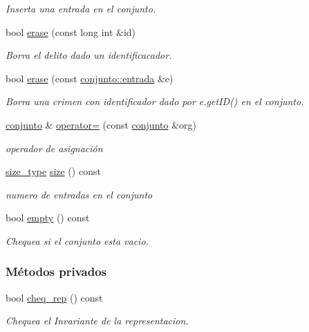\begin{DoxyCompactItemize}
\begin{DoxyCompactList}\small\item\em Inserta una entrada en el conjunto. \end{DoxyCompactList}\item 
bool \hyperlink{classconjunto_ad550177fa4454da3a10fa356417e39a7}{erase} (const long int \&id)
\begin{DoxyCompactList}\small\item\em Borra el delito dado un identificacador. \end{DoxyCompactList}\item 
bool \hyperlink{classconjunto_a77a21ed91f1002f4eaed48d86535a874}{erase} (const \hyperlink{classconjunto_a09cad766dd65de73e51eae21f9d22585}{conjunto\-::entrada} \&e)
\begin{DoxyCompactList}\small\item\em Borra una crimen con identificador dado por e.\-get\-I\-D() en el conjunto. \end{DoxyCompactList}\item 
\hyperlink{classconjunto}{conjunto} \& \hyperlink{classconjunto_a2bdce402a4b76117b68fe71c0dffab87}{operator=} (const \hyperlink{classconjunto}{conjunto} \&org)
\begin{DoxyCompactList}\small\item\em operador de asignación \end{DoxyCompactList}\item 
\hyperlink{classconjunto_a855a5893bb0f5a851ab2dbf2b8aa6cc7}{size\-\_\-type} \hyperlink{classconjunto_a863e1e106e35adda47e7c5e2067295b9}{size} () const 
\begin{DoxyCompactList}\small\item\em numero de entradas en el conjunto \end{DoxyCompactList}\item 
bool \hyperlink{classconjunto_afcf4ff3ff3c1f83b63e901efebe93533}{empty} () const 
\begin{DoxyCompactList}\small\item\em Chequea si el conjunto esta vacio. \end{DoxyCompactList}\end{DoxyCompactItemize}
\subsubsection*{Métodos privados}
\begin{DoxyCompactItemize}
\item 
bool \hyperlink{classconjunto_adb0ff15cf65817b0b279bae4bf06decb}{cheq\-\_\-rep} () const 
\begin{DoxyCompactList}\small\item\em Chequea el Invariante de la representacion. \end{DoxyCompactList}\end{DoxyCompactItemize}
